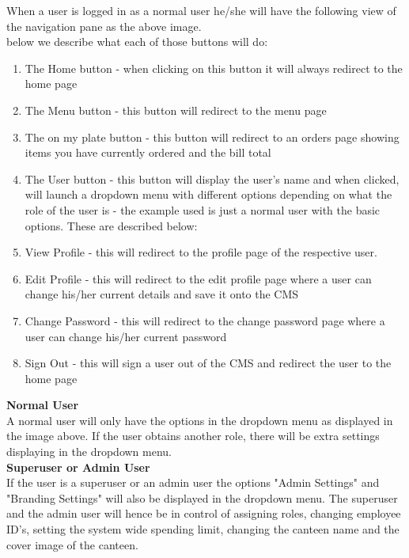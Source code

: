 \documentclass[a4paper,12pt]{report}
\begin{document}
When a user is logged in as a normal user he/she will have the following view of the navigation pane as the above image.\\ below we describe what each of those buttons will do: \\

\begin{enumerate}
\item The Home button - when clicking on this button it will always redirect to the home page
\item The Menu button - this button will redirect to the menu page
\item The on my plate button - this button will redirect to an orders page showing items you have currently ordered and the bill total
\item The User button - this button will display the user's name and when clicked, will launch a dropdown menu with different options depending on what the role of the user is - the example used is just a normal user with the basic options. These are described below:
\item View Profile - this will redirect to the profile page of the respective user.
\item Edit Profile - this will redirect to the edit profile page where a user can change his/her current details and save it onto the CMS
\item Change Password - this will redirect to the change password page where a user can change his/her current password
\item Sign Out  - this will sign a user out of the CMS and redirect the user to the home page
\end{enumerate}

\textbf{Normal User}\\
A normal user will only have the options in the dropdown menu as displayed in the image above. If the user obtains another role, there will be extra settings displaying in the dropdown menu.\\

\textbf{Superuser or Admin User}\\
If the user is a superuser or an admin user the options "Admin Settings" and "Branding Settings" will also be displayed in the dropdown menu. The superuser and the admin user will hence be in control of assigning roles, changing employee ID's, setting the system wide spending limit, changing the canteen name and the cover image of the canteen.  \\
\end{document}
